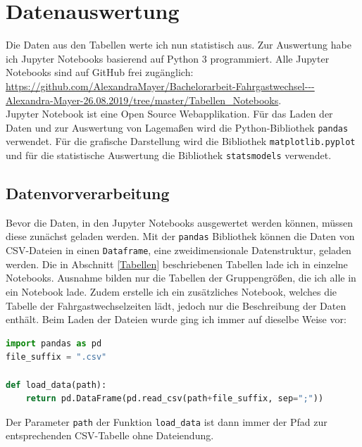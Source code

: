 \chapter{Datenauswertung} \label{Datenauswertung}
\begin{sloppypar}
Die Daten aus den Tabellen werte ich nun statistisch aus. Zur Auswertung habe ich \textsf{Jupyter Notebooks} basierend auf Python 3 programmiert. Alle \textsf{Jupyter Notebooks} sind auf GitHub frei zugänglich: \url{https://github.com/AlexandraMayer/Bachelorarbeit-Fahrgastwechsel---Alexandra-Mayer-26.08.2019/tree/master/Tabellen_Notebooks}.\\
\textsf{Jupyter Note\-book} ist eine Open Source Webapplikation. Für das Laden der Daten und zur Auswertung von Lagemaßen wird die Python-Bibliothek \texttt{pandas} verwendet. Für die grafische Darstellung wird die Bibliothek \texttt{matplotlib.pyplot} und für die statistische Auswertung die Bibliothek \texttt{statsmodels} verwendet.
\end{sloppypar}

\section{Datenvorverarbeitung}  \label{Datenvorverarbeitung}
Bevor die Daten, in den \textsf{Jupyter Notebooks} ausgewertet werden können, müssen diese zunächst geladen werden. Mit der \texttt{pandas} Bibliothek können die Daten von CSV-Dateien in einen \texttt{Dataframe}, eine zweidimensionale Datenstruktur, geladen werden. Die in Abschnitt \ref{Tabellen} beschriebenen Tabellen lade ich in einzelne \textsf{Notebooks}. Ausnahme bilden nur die Tabellen der Gruppengrößen, die ich alle in ein \textsf{Notebook} lade. Zudem erstelle ich ein zusätzliches \textsf{Notebook}, welches die Tabelle der Fahrgastwechselzeiten lädt, jedoch nur die Beschreibung der Daten enthält. Beim Laden der Dateien wurde ging ich immer auf dieselbe Weise vor:

\begin{lstlisting}[language=Python]
import pandas as pd
file_suffix = ".csv"
 
def load_data(path):
    return pd.DataFrame(pd.read_csv(path+file_suffix, sep=";"))

\end{lstlisting}
Der Parameter \texttt{path} der Funktion \texttt{load\_data} ist dann immer der Pfad zur entsprechenden CSV-Tabelle ohne Dateiendung.

